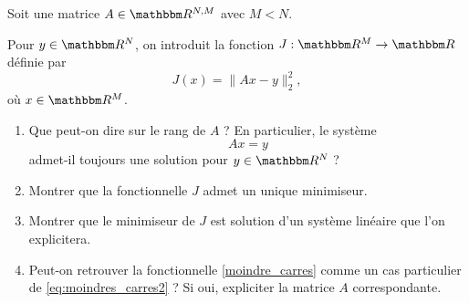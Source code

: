 \begin{exercice}

Soit une matrice $A \in \eR^{N,M}$ avec $M<N$. 

\medskip

Pour $y\in\eR^N$, on introduit la fonction $J : \eR^M \rightarrow \eR$ définie par
\begin{equation} \label{eq:moindres_carres2}
J(x) = \| A x - y \|^2_2,
\end{equation}
où $x \in \eR^M$.

\begin{enumerate}

\item Que peut-on dire sur le rang de $A$ ? En particulier, le système 
\[
A x = y
\]
admet-il toujours une solution pour $y\in\eR^N$ ?

\item Montrer que la fonctionnelle $J$ admet un unique minimiseur.

\item Montrer que le minimiseur de $J$ est solution d'un système linéaire que l'on explicitera.

\item Peut-on retrouver la fonctionnelle \eqref{moindre_carres} comme un cas particulier de \eqref{eq:moindres_carres2} ? Si oui, expliciter la matrice $A$ correspondante.

\end{enumerate}

\end{exercice}

%
%


%
%






\newpage

